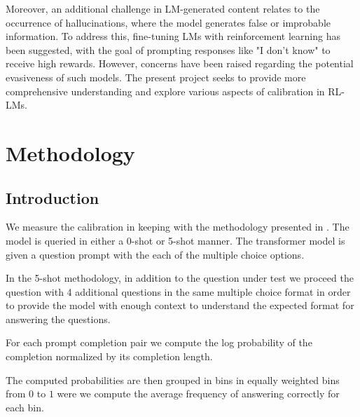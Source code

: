 \documentclass[11pt]{article}
\begin{document}
Moreover, an additional challenge in LM-generated content relates to the occurrence of hallucinations, where the model generates false or improbable information. To address this, fine-tuning LMs with reinforcement learning has been suggested, with the goal of prompting responses like "I don't know" to receive high rewards. However, concerns have been raised regarding the potential evasiveness of such models. The present project seeks to provide more comprehensive understanding and explore various aspects of calibration in RL-LMs.






\section{Methodology}

\subsection{Introduction}

We measure the calibration in keeping with the methodology presented 
in  \cite{kadavath2022language}. The model is queried in either a
0-shot or 5-shot manner. The transformer model is given a 
question prompt  with the each of the multiple choice options.  

In the 5-shot methodology, in addition to the question under 
test we proceed the question with 4 additional questions 
in the same multiple choice format in order to provide 
the model with enough context to understand the expected format for answering the questions.

For each prompt completion pair we compute the log probability 
of  the completion normalized by its completion length. 

The computed probabilities are then grouped in bins in 
equally weighted bins from  $0$ to $1$ were we compute 
the average frequency of answering correctly for each bin. 
\end{document}
